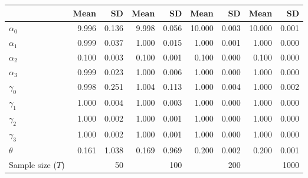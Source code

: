 
\begin{tabular}[t]{lrrrrrrrr}
\toprule
  & Mean & SD & Mean  & SD  & Mean   & SD   & Mean    & SD   \\
\midrule
$\alpha_{0}$ & 9.996 & 0.136 & 9.998 & 0.056 & 10.000 & 0.003 & 10.000 & 0.001\\
$\alpha_{1}$ & 0.999 & 0.037 & 1.000 & 0.015 & 1.000 & 0.001 & 1.000 & 0.000\\
$\alpha_{2}$ & 0.100 & 0.003 & 0.100 & 0.001 & 0.100 & 0.000 & 0.100 & 0.000\\
$\alpha_{3}$ & 0.999 & 0.023 & 1.000 & 0.006 & 1.000 & 0.000 & 1.000 & 0.000\\
$\gamma_{0}$ & 0.998 & 0.251 & 1.004 & 0.113 & 1.000 & 0.004 & 1.000 & 0.002\\
$\gamma_{1}$ & 1.000 & 0.004 & 1.000 & 0.003 & 1.000 & 0.000 & 1.000 & 0.000\\
$\gamma_{2}$ & 1.000 & 0.002 & 1.000 & 0.001 & 1.000 & 0.000 & 1.000 & 0.000\\
$\gamma_{3}$ & 1.000 & 0.002 & 1.000 & 0.001 & 1.000 & 0.000 & 1.000 & 0.000\\
$\theta$ & 0.161 & 1.038 & 0.169 & 0.969 & 0.200 & 0.002 & 0.200 & 0.001\\
Sample size ($T$) &  & 50 &  & 100 &  & 200 &  & 1000\\
\bottomrule
\end{tabular}
